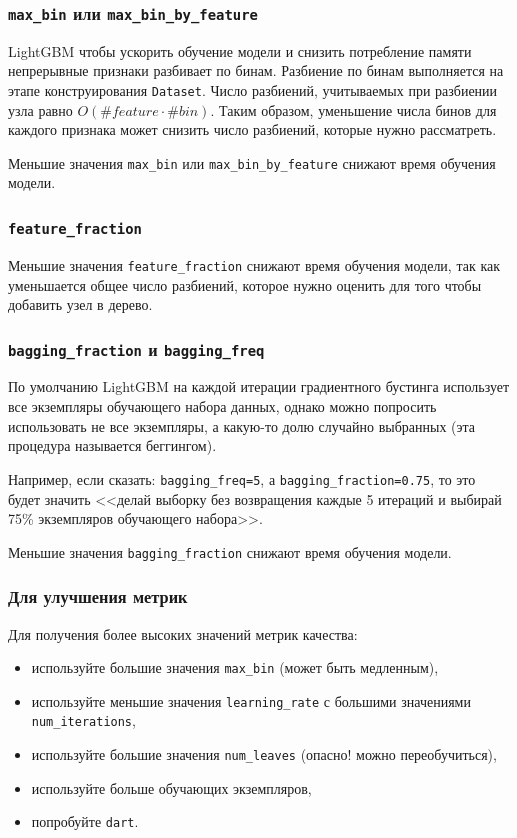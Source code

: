 \documentclass[%
	11pt,
	a4paper,
	utf8,
		]{article}
\begin{document}
\subsubsection{\texttt{max\_bin} или \texttt{max\_bin\_by\_feature}}

LightGBM чтобы ускорить обучение модели и снизить потребление памяти непрерывные признаки разбивает по бинам. Разбиение по бинам выполняется на этапе конструирования \verb|Dataset|. Число разбиений, учитываемых при разбиении узла равно $ O(\#feature \cdot \#bin) $. Таким образом, уменьшение числа бинов для каждого признака может снизить число разбиений, которые нужно рассматреть.

Меньшие значения \verb|max_bin| или \verb|max_bin_by_feature| снижают время обучения модели.

\subsubsection{\texttt{feature\_fraction}}

Меньшие значения \verb|feature_fraction| снижают время обучения модели, так как уменьшается общее число разбиений, которое нужно оценить для того чтобы добавить узел в дерево.

\subsubsection{\texttt{bagging\_fraction} и \texttt{bagging\_freq}}

По умолчанию LightGBM на каждой итерации градиентного бустинга использует все экземпляры обучающего набора данных, однако можно попросить использовать не все экземпляры, а какую-то долю случайно выбранных (эта процедура называется беггингом).

Например, если сказать: \verb|bagging_freq=5|, а \verb|bagging_fraction=0.75|, то это будет значить <<делай выборку без возвращения каждые 5 итераций и выбирай 75\% экземпляров обучающего набора>>.

Меньшие значения \verb|bagging_fraction| снижают время обучения модели.

\subsubsection{Для улучшения метрик}

Для получения более высоких значений метрик качества:
\begin{itemize}
	\item используйте большие значения \verb|max_bin| (может быть медленным),
	
	\item используйте меньшие значения \verb|learning_rate| с большими значениями \verb|num_iterations|,
	
	\item используйте большие значения \verb|num_leaves| (опасно! можно переобучиться),
	
	\item используйте больше обучающих экземпляров,
	
	\item попробуйте \verb|dart|.
\end{itemize}
\end{document}
